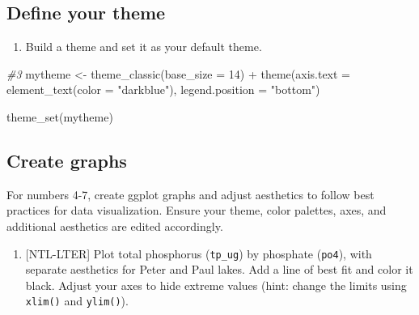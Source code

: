 \documentclass[]{article}
\newenvironment{Shaded}{\begin{snugshade}}{\end{snugshade}}
\newcommand{\AttributeTok}[1]{\textcolor[rgb]{0.77,0.63,0.00}{#1}}
\newcommand{\CommentTok}[1]{\textcolor[rgb]{0.56,0.35,0.01}{\textit{#1}}}
\newcommand{\DecValTok}[1]{\textcolor[rgb]{0.00,0.00,0.81}{#1}}
\newcommand{\FunctionTok}[1]{\textcolor[rgb]{0.00,0.00,0.00}{#1}}
\newcommand{\NormalTok}[1]{#1}
\newcommand{\OtherTok}[1]{\textcolor[rgb]{0.56,0.35,0.01}{#1}}
\newcommand{\SpecialCharTok}[1]{\textcolor[rgb]{0.00,0.00,0.00}{#1}}
\newcommand{\StringTok}[1]{\textcolor[rgb]{0.31,0.60,0.02}{#1}}
\providecommand{\tightlist}{%
  \setlength{\itemsep}{0pt}\setlength{\parskip}{0pt}}
\begin{document}
\hypertarget{define-your-theme}{%
\subsection{Define your theme}\label{define-your-theme}}

\begin{enumerate}
\def\labelenumi{\arabic{enumi}.}
\setcounter{enumi}{2}
\tightlist
\item
  Build a theme and set it as your default theme.
\end{enumerate}

\begin{Shaded}
\begin{Highlighting}[]
\CommentTok{\#3}
\NormalTok{mytheme }\OtherTok{\textless{}{-}} \FunctionTok{theme\_classic}\NormalTok{(}\AttributeTok{base\_size =} \DecValTok{14}\NormalTok{) }\SpecialCharTok{+}
  \FunctionTok{theme}\NormalTok{(}\AttributeTok{axis.text =} \FunctionTok{element\_text}\NormalTok{(}\AttributeTok{color =} \StringTok{"darkblue"}\NormalTok{), }
        \AttributeTok{legend.position =} \StringTok{"bottom"}\NormalTok{)}

\FunctionTok{theme\_set}\NormalTok{(mytheme)}
\end{Highlighting}
\end{Shaded}

\hypertarget{create-graphs}{%
\subsection{Create graphs}\label{create-graphs}}

For numbers 4-7, create ggplot graphs and adjust aesthetics to follow
best practices for data visualization. Ensure your theme, color
palettes, axes, and additional aesthetics are edited accordingly.

\begin{enumerate}
\def\labelenumi{\arabic{enumi}.}
\setcounter{enumi}{3}
\tightlist
\item
  {[}NTL-LTER{]} Plot total phosphorus (\texttt{tp\_ug}) by phosphate
  (\texttt{po4}), with separate aesthetics for Peter and Paul lakes. Add
  a line of best fit and color it black. Adjust your axes to hide
  extreme values (hint: change the limits using \texttt{xlim()} and
  \texttt{ylim()}).
\end{enumerate}
\end{document}
